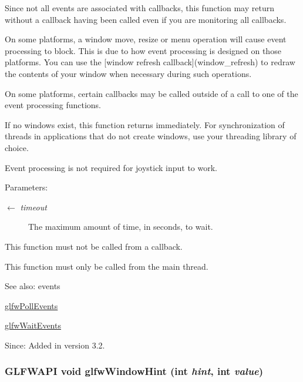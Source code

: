 Since not all events are associated with callbacks, this function may return without a callback having been called even if you are monitoring all callbacks.

On some platforms, a window move, resize or menu operation will cause event processing to block. This is due to how event processing is designed on those platforms. You can use the \mbox{[}window refresh callback\mbox{]}(window\_\-refresh) to redraw the contents of your window when necessary during such operations.

On some platforms, certain callbacks may be called outside of a call to one of the event processing functions.

If no windows exist, this function returns immediately. For synchronization of threads in applications that do not create windows, use your threading library of choice.

Event processing is not required for joystick input to work.

\begin{Desc}
\item[Parameters:]
\begin{description}
\item[\mbox{$\leftarrow$} {\em timeout}]The maximum amount of time, in seconds, to wait.\end{description}
\end{Desc}
This function must not be called from a callback.

This function must only be called from the main thread.

\begin{Desc}
\item[See also:]events 

\hyperlink{group__window_g872d16e4c77f58c0436f356255920cfc}{glfwPollEvents} 

\hyperlink{group__window_g6e042d05823c11e11c7339b81a237738}{glfwWaitEvents}\end{Desc}
\begin{Desc}
\item[Since:]Added in version 3.2. \end{Desc}
\hypertarget{group__window_g69c40728499720bef8a49aa925ea0efa}{
\subsubsection[glfwWindowHint]{\setlength{\rightskip}{0pt plus 5cm}GLFWAPI void glfwWindowHint (int {\em hint}, \/  int {\em value})}}
\label{group__window_g69c40728499720bef8a49aa925ea0efa}


